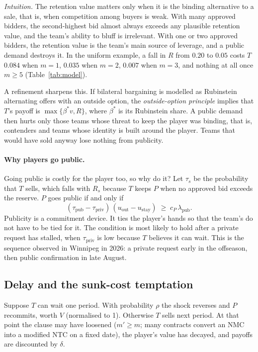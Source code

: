 \noindent\emph{Intuition.} The retention value matters only when it is the binding alternative to a sale, that is, when competition among buyers is weak. With many approved bidders, the second-highest bid almost always exceeds any plausible retention value, and the team's ability to bluff is irrelevant. With one or two approved bidders, the retention value is the team's main source of leverage, and a public demand destroys it. In the uniform example, a fall in $R$ from $0.20$ to $0.05$ costs $T$ $0.084$ when $m=1$, $0.035$ when $m=2$, $0.007$ when $m=3$, and nothing at all once $m\ge5$ (Table~\ref{tab:model}).

A refinement sharpens this. If bilateral bargaining is modelled as Rubinstein alternating offers with an outside option, the \emph{outside-option principle} \citep{rubinstein1982,bss1989} implies that $T$'s payoff is $\max\{\beta^\ast v, R\}$, where $\beta^\ast$ is its Rubinstein share. A public demand then hurts only those teams whose threat to keep the player was binding, that is, contenders and teams whose identity is built around the player. Teams that would have sold anyway lose nothing from publicity.

\paragraph{Why players go public.} Going public is costly for the player too, so why do it? Let $\tau_s$ be the probability that $T$ sells, which falls with $R_s$ because $T$ keeps $P$ when no approved bid exceeds the reserve. $P$ goes public if and only if
\begin{equation}\label{eq:public}
(\tau_{\text{pub}}-\tau_{\text{priv}})\,(u_{\text{out}}-u_{\text{stay}}) \;\ge\; c_P\,\lambda_{\text{pub}}.
\end{equation}
Publicity is a commitment device. It ties the player's hands so that the team's do not have to be tied for it. The condition is most likely to hold after a private request has stalled, when $\tau_{\text{priv}}$ is low because $T$ believes it can wait. This is the sequence observed in Winnipeg in 2026: a private request early in the offseason, then public confirmation in late August.

\subsection{Delay and the sunk-cost temptation}

Suppose $T$ can wait one period. With probability $\rho$ the shock reverses and $P$ recommits, worth $V$ (normalised to 1). Otherwise $T$ sells next period. At that point the clause may have loosened ($m'\ge m$; many contracts convert an NMC into a modified NTC on a fixed date), the player's value has decayed, and payoffs are discounted by $\delta$.

